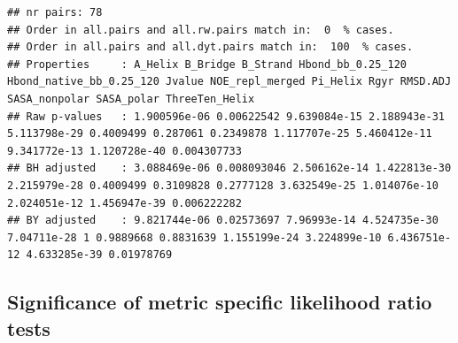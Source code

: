 \documentclass{article}\usepackage[table]{xcolor}
\makeatletter
\newenvironment{kframe}{%
 \def\at@end@of@kframe{}%
 \ifinner\ifhmode%
  \def\at@end@of@kframe{\end{minipage}}%
  \begin{minipage}{\columnwidth}%
 \fi\fi%
 \def\FrameCommand##1{\hskip\@totalleftmargin \hskip-\fboxsep
 \colorbox{shadecolor}{##1}\hskip-\fboxsep
     \hskip-\linewidth \hskip-\@totalleftmargin \hskip\columnwidth}%
 \MakeFramed {\advance\hsize-\width
   \@totalleftmargin\z@ \linewidth\hsize
   \@setminipage}}%
 {\par\unskip\endMakeFramed%
 \at@end@of@kframe}
\newenvironment{knitrout}{}{} %
\renewcommand{\$}{$} %
\makeatother
\begin{document}
\begin{knitrout}
\color{fgcolor}\begin{kframe}
\begin{verbatim}
## nr pairs: 78
## Order in all.pairs and all.rw.pairs match in:  0  % cases.
## Order in all.pairs and all.dyt.pairs match in:  100  % cases.
## Properties     : A_Helix B_Bridge B_Strand Hbond_bb_0.25_120 Hbond_native_bb_0.25_120 Jvalue NOE_repl_merged Pi_Helix Rgyr RMSD.ADJ SASA_nonpolar SASA_polar ThreeTen_Helix
## Raw p-values   : 1.900596e-06 0.00622542 9.639084e-15 2.188943e-31 5.113798e-29 0.4009499 0.287061 0.2349878 1.117707e-25 5.460412e-11 9.341772e-13 1.120728e-40 0.004307733
## BH adjusted    : 3.088469e-06 0.008093046 2.506162e-14 1.422813e-30 2.215979e-28 0.4009499 0.3109828 0.2777128 3.632549e-25 1.014076e-10 2.024051e-12 1.456947e-39 0.006222282
## BY adjusted    : 9.821744e-06 0.02573697 7.96993e-14 4.524735e-30 7.04711e-28 1 0.9889668 0.8831639 1.155199e-24 3.224899e-10 6.436751e-12 4.633285e-39 0.01978769
\end{verbatim}
\end{kframe}
\end{knitrout}

\subsection{Significance of metric specific likelihood ratio tests}
\end{document}

